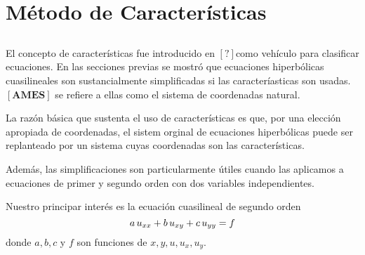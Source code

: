\chapter{Método de Características}\label{cap:características}

\section{}
El concepto de características fue introducido en $[?]$como vehículo para clasificar ecuaciones. En las secciones previas se mostró que ecuaciones hiperbólicas cuasilineales son sustancialmente simplificadas si las caracteríasticas son usadas. $[\textbf{AMES}]$ se refiere a ellas como el sistema de coordenadas natural. 

La razón básica que sustenta el uso de características es que, por una elección apropiada de coordenadas, el sistem orginal de ecuaciones hiperbólicas puede ser replanteado por un sistema cuyas coordenadas son las características.

Además, las simplificaciones son particularmente útiles cuando las aplicamos a ecuaciones de primer y segundo orden con dos variables independientes.

Nuestro principar interés es la ecuación cuasilineal de segundo orden
\[
a \thinspace u_{xx} + b \thinspace u_{xy} + c \thinspace u_{yy} = f
\]
donde $a,b,c$ y $f$ son funciones de $x,y,u, u_x, u_y$.


 